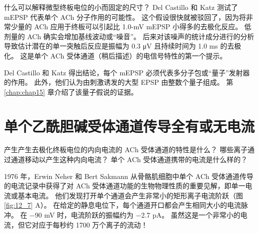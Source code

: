 什么可以解释微型终板电位的小而固定的尺寸？ 
Del Castillo 和 Katz 测试了 mEPSP 代表单个 ACh 分子作用的可能性。 
这个假设很快就被驳回了，因为将非常少量的 ACh 应用于终板可以引起比 1.0-mV mEPSP 小得多的去极化反应。 
低剂量的 ACh 确实会增加基线波动或“噪音”。 
后来对该噪声的统计成分进行的分析导致估计潜在的单一突触后反应是振幅为 0.3 μV 且持续时间为 1.0 ms 的去极化。 
这是单个 ACh 受体通道（稍后描述）的电信号特性的第一个提示。


Del Castillo 和 Katz 得出结论，每个 mEPSP 必须代表多分子包或“量子”发射器的作用。 
此外，他们认为由刺激诱发的大型 EPSP 由整数个量子组成。 
第 \ref{chap:chap15} 章介绍了该量子假说的证据。


\section{单个乙酰胆碱受体通道传导全有或无电流}
产生产生去极化终板电位的内向电流的 ACh 受体通道的特性是什么？ 
哪些离子通过通道移动以产生这种内向电流？ 
单个 ACh 受体通道携带的电流是什么样的？


1976 年，Erwin Neher 和 Bert Sakmann 从骨骼肌细胞中单个 ACh 受体通道传导的电流记录中获得了对 ACh 受体通道功能的生物物理性质的重要见解，即单一电流或基本电流。 
他们发现打开单个通道会产生非常小的矩形离子电流阶跃（图 \ref{fig:12_7} A）。
在给定的静息电位下，每个通道开口都会产生相同大小的电流脉冲。
在 −90 mV 时，电流阶跃的振幅约为 −2.7 pA。 
虽然这是一个非常小的电流，但它对应于每秒约 1700 万个离子的流动！

